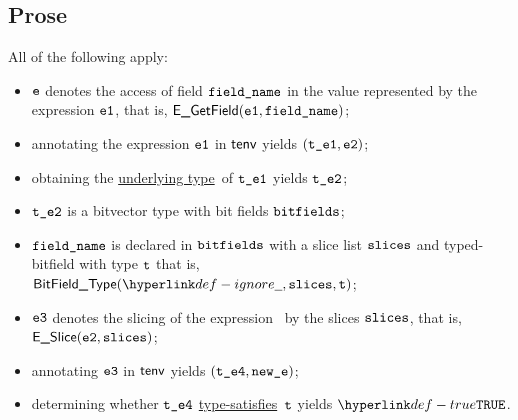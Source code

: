 \documentclass{book}
\newcommand\ProseOrTypeError[0]{\ProseTerminateAs{\TypeErrorConfig}}
\newcommand\underlyingtype[0]{\hyperlink{def-underlyingtype}{underlying type}}
\newcommand\typesatisfies[0]{\hyperlink{def-typesatisfies}{type-satisfies}}
\begin{document}
\subsection{Prose}
All of the following apply:
\begin{itemize}
  \item $\texttt{e}$ denotes the access of field $\texttt{field\_name}$ in the value represented by the expression $\texttt{e1}$, that is, $\textsf{E\_GetField}(\texttt{e1}, \texttt{field\_name})$;
  \item annotating the expression $\texttt{e1}$ in $\textsf{tenv}$ yields $(\texttt{t\_e1}, \texttt{e2})$\ProseOrTypeError;
  \item obtaining the \underlyingtype\ of $\texttt{t\_e1}$ yields $\texttt{t\_e2}$\ProseOrTypeError;
  \item $\texttt{t\_e2}$ is a bitvector type with bit fields $\texttt{bitfields}$;
  \item $\texttt{field\_name}$ is declared in $\texttt{bitfields}$ with a slice list $\texttt{slices}$ and typed-bitfield with type $\texttt{t}$ that is,
        $\BitFieldType(\Ignore, \slices, \vt)$;
  \item $\texttt{e3}$ denotes the slicing of the expression \vetwo\ by the slices $\texttt{slices}$, that is, \\ $\textsf{E\_Slice}(\texttt{e2}, \texttt{slices})$;
  \item annotating $\texttt{e3}$ in $\textsf{tenv}$ yields $(\texttt{t\_e4}, \texttt{new\_e})$\ProseOrTypeError;
  \item determining whether $\texttt{t\_e4}$ \typesatisfies\ $\texttt{t}$ yields $\True$\ProseOrTypeError.
\end{itemize}


\end{document}
